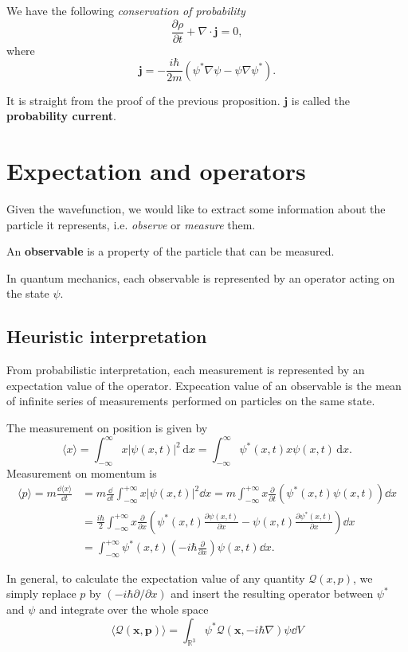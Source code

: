 \documentclass[a4paper,11pt]{article}
\begin{document}
\begin{proposition}
    We have the following \textit{conservation of probability}
    \[
    \frac{\partial \rho}{\partial t}+\nabla \cdot \mathbf{j}=0,
    \]
    where
    \[
    \mathbf{j}=-\frac{i \hbar}{2 m}\left(\psi^* \nabla \psi-\psi \nabla \psi^*\right).
    \]
\end{proposition}

It is straight from the proof of the previous proposition. $ \mathbf{j} $ is called the \textbf{probability current}. 

\section{Expectation and operators}

Given the wavefunction, we would like to extract some information about the particle it represents, i.e. \textit{observe} or \textit{measure} them. 
\begin{definition}
	An \textbf{observable} is a property of the particle that can be measured.
\end{definition}

In quantum mechanics, each observable is represented by an operator acting on the state \( \psi \).

\subsection{Heuristic interpretation}
From probabilistic interpretation, each measurement is represented by an expectation value of the operator. Expecation value of an observable is the mean of infinite series of measurements performed on particles on the same state. 
\begin{example}
    The measurement on position is given by 
    \[
    \langle x \rangle  = \int_{-\infty}^{\infty} x \left| \psi(x,t) \right| ^2 \,\mathrm{d}x = \int_{-\infty}^{\infty} \psi^*(x,t) x \psi(x,t) \,\mathrm{d}x.
    \]
    Measurement on momentum is 
    \[
        \begin{aligned}
            \langle p\rangle =m \frac{\dd\langle x\rangle}{\dd t}&=m \frac{\dd}{\dd t} \int_{-\infty}^{+\infty} x|\psi(x, t)|^2 \dd x=m \int_{-\infty}^{+\infty} x \frac{\partial}{\partial t}\left(\psi^*(x, t) \psi(x, t)\right) \dd x \\
            &=\frac{i \hbar}{2} \int_{-\infty}^{+\infty} x \frac{\partial}{\partial x}\left(\psi^*(x, t) \frac{\partial \psi(x, t)}{\partial x}-\psi(x, t) \frac{\partial \psi^*(x, t)}{\partial x}\right) \dd x\\ 
            &= \int_{-\infty}^{+\infty} \psi^*(x, t)\left(-i \hbar \frac{\partial}{\partial x}\right) \psi(x, t) \dd x.
        \end{aligned}
    \]
\end{example}
In general, to calculate the expectation value of any quantity $\mathcal{Q}(x, p)$, we simply replace $p$ by $(-i \hbar \partial / \partial x)$ and insert the resulting operator between $\psi^*$ and $\psi$ and integrate over the whole space
\[
\langle\mathcal{Q}(\mathbf{x}, \mathbf{p})\rangle=\int_{\mathbb{R}^3} \psi^* \mathcal{Q}(\mathbf{x},-i \hbar \nabla) \psi \dd V
\]
\end{document}
